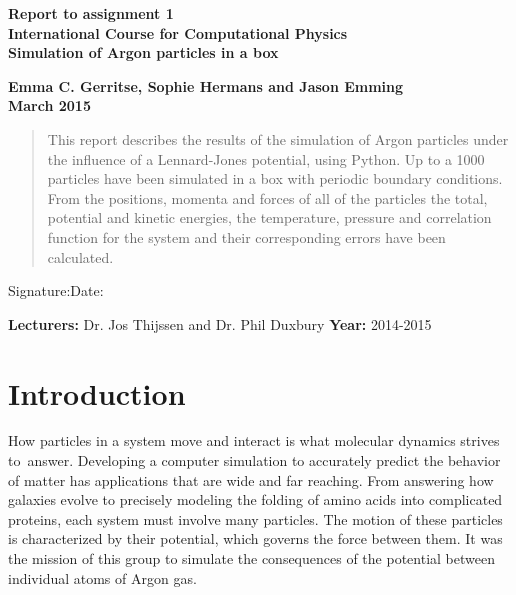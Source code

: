 \documentclass[a4paper,twoside,12pt]{article}
\begin{document}
\pagestyle{empty}                       							%
\vspace*{2cm}
\begin{center}
        \Large\bf \Large\bf Report to assignment 1 \\
        \Large\bf International Course for Computational Physics\\[10pt]%
        \LARGE\bf Simulation of Argon particles in a box         		%
\end{center}
\vspace*{0.5cm}
\begin{center}
        \bf Emma C. Gerritse, Sophie Hermans and Jason Emming\\ 	%
        March 2015                                    						%
\end{center}
\vspace*{5mm}
%
%                       
\begin{abstract}
This report describes the results of the simulation of Argon particles under the influence of a Lennard-Jones potential, using Python. Up to a 1000 particles have been simulated in a box with periodic boundary conditions. From the positions, momenta and forces of all of the particles the total, potential and kinetic energies, the temperature, pressure and correlation function for the system and their corresponding errors have been calculated.
\end{abstract}

\vspace*{2cm}
Signature:\hspace*{8cm}Date:

\vfill
{\bf Lecturers:} Dr. Jos Thijssen and Dr. Phil Duxbury        	%
\hfill
\textbf{Year:} 2014-2015                 					%
\newpage
\pagestyle{plain}                               					%
\setcounter{page}{1}                         					%
\tableofcontents                                					%

\pagebreak


\section{Introduction}
\noindent How particles in a system move and interact is what molecular dynamics strives \mbox{to answer.} Developing a computer simulation to accurately predict the behavior of matter has applications that are wide and far reaching. From answering how galaxies evolve to precisely modeling the folding of amino acids into complicated proteins, each system must \mbox{involve} many particles. The motion of these particles is characterized by their potential, which governs the force between them. It was the mission of this group to simulate the consequences of the potential between individual atoms of Argon gas. 
\end{document}
